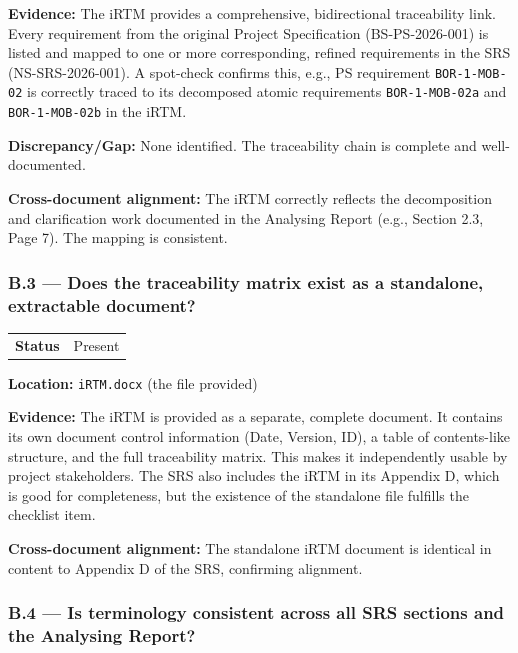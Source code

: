 \documentclass[11pt,a4paper]{article}
\begin{document}
\textbf{Evidence:} The iRTM provides a comprehensive, bidirectional traceability link. Every requirement from the original Project Specification (BS-PS-2026-001) is listed and mapped to one or more corresponding, refined requirements in the SRS (NS-SRS-2026-001). A spot-check confirms this, e.g., PS requirement \texttt{BOR-1-MOB-02} is correctly traced to its decomposed atomic requirements \texttt{BOR-1-MOB-02a} and \texttt{BOR-1-MOB-02b} in the iRTM.

\textbf{Discrepancy/Gap:} None identified. The traceability chain is complete and well-documented.

\textbf{Cross-document alignment:} The iRTM correctly reflects the decomposition and clarification work documented in the Analysing Report (e.g., Section 2.3, Page 7). The mapping is consistent.

\vspace{0.8em}

\subsubsection*{B.3 --- Does the traceability matrix exist as a standalone, extractable document?}

\begin{tabular}{p{}p{}}
\textbf{Status} & Present \\
\end{tabular}

\textbf{Location:} \texttt{iRTM.docx} (the file provided)

\textbf{Evidence:} The iRTM is provided as a separate, complete document. It contains its own document control information (Date, Version, ID), a table of contents-like structure, and the full traceability matrix. This makes it independently usable by project stakeholders. The SRS also includes the iRTM in its Appendix D, which is good for completeness, but the existence of the standalone file fulfills the checklist item.

\textbf{Cross-document alignment:} The standalone iRTM document is identical in content to Appendix D of the SRS, confirming alignment.

\vspace{0.8em}

\subsubsection*{B.4 --- Is terminology consistent across all SRS sections and the Analysing Report?}
\end{document}
